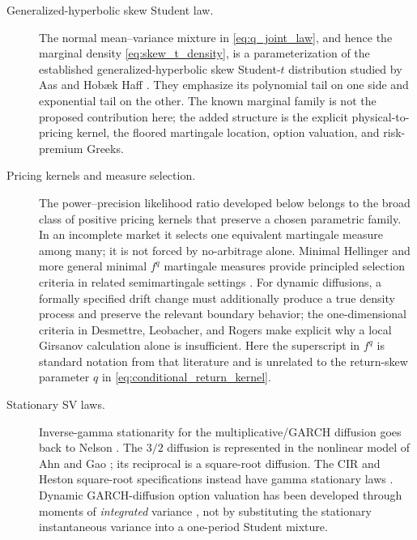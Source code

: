 \documentclass[11pt,a4paper]{article}
\begin{document}
\begin{description}
  \item[Generalized-hyperbolic skew Student law.]
  The normal mean--variance mixture in \eqref{eq:q_joint_law}, and hence the
  marginal density \eqref{eq:skew_t_density}, is a parameterization of the
  established generalized-hyperbolic skew Student-$t$ distribution studied by
  Aas and Hob\ae k Haff \cite{AasHaff2006}.  They emphasize its polynomial
  tail on one side and exponential tail on the other.  The known marginal
  family is not the proposed contribution here; the added structure is the
  explicit physical-to-pricing kernel, the floored martingale location,
  option valuation, and risk-premium Greeks.

  \item[Pricing kernels and measure selection.]
  The power--precision likelihood ratio developed below belongs to the broad
  class of positive pricing kernels that preserve a chosen parametric family.
  In an incomplete market it selects one equivalent martingale measure among
  many; it is not forced by no-arbitrage alone.  Minimal Hellinger and more
  general minimal $f^q$ martingale measures provide principled selection
  criteria in related semimartingale settings
  \cite{ChoulliStrickerLi2007,JeanblancKloppelMiyahara2007}.  For dynamic
  diffusions, a formally specified drift change must additionally produce a
  true density process and preserve the relevant boundary behavior; the
  one-dimensional criteria in Desmettre, Leobacher, and Rogers
  \cite{DesmettreLeobacherRogers2021} make explicit why a local Girsanov
  calculation alone is insufficient.
  Here the superscript in $f^q$ is standard notation from that literature and
  is unrelated to the return-skew parameter $q$ in
  \eqref{eq:conditional_return_kernel}.

  \item[Stationary SV laws.]
  Inverse-gamma stationarity for the multiplicative/GARCH diffusion goes back
  to Nelson \cite{Nelson1990}.  The $3/2$ diffusion is represented in the
  nonlinear model of Ahn and Gao \cite{AhnGao1999}; its reciprocal is a
  square-root diffusion.  The CIR and Heston square-root specifications instead
  have gamma stationary laws \cite{CIR1985,Heston1993}.  Dynamic GARCH-diffusion
  option valuation has been developed through moments of \emph{integrated}
  variance \cite{BaroneAdesiRasmussenRavanelli2005}, not by substituting the
  stationary instantaneous variance into a one-period Student mixture.
\end{description}
\end{document}
